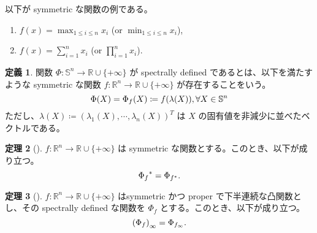\documentclass[a4paper,11pt]{jsarticle}
\theoremstyle{definition}
\newtheorem{thm}{定理}
\newtheorem{dfn}[thm]{定義}
\newcommand{\RealNumberSet}{\mathbb{R}}
\newcommand{\NDemenstionalRealEuclideanSpace}{\mathbb{R}^n}
\newcommand{\NDemenstionalRealSymmetricMatrixSpace}{\mathbb{S}^n}
\newcommand{\ExtendedRealValuedFunction}[2]{{#1}: {#2} \to \RealNumberSet \cup \{+\infty\}}
\begin{document}
以下が symmetric な関数の例である。

\begin{enumerate}
  \item $f(x) = \max_{1 \leq i \leq n} x_i$ (or $\min_{1 \leq i \leq n} x_i$),
  \item $f(x) = \sum_{i = 1}^{n} x_i$ (or $\prod_{i = 1}^{n} x_i$).
\end{enumerate}

\begin{dfn}
  関数 $\ExtendedRealValuedFunction{\Phi}{\NDemenstionalRealSymmetricMatrixSpace}$ が spectrally defined であるとは、以下を満たすような symmetric な関数 $\ExtendedRealValuedFunction{f}{\NDemenstionalRealEuclideanSpace}$ が存在することをいう。
  \begin{equation}
    \Phi (X) = \Phi_{f}(X) \coloneqq f(\lambda (X)), \forall X \in \NDemenstionalRealSymmetricMatrixSpace \notag
  \end{equation}
  ただし、$\lambda (X) \coloneqq (\lambda_1 (X), \dotsb , \lambda_n (X))^T$ は $X$ の固有値を非減少に並べたベクトルである。
\end{dfn}

\begin{thm}[\mbox{\cite[Lewis (1996)]{Lewis96}}]\label{Lewis96}
  $\ExtendedRealValuedFunction{f}{\NDemenstionalRealEuclideanSpace}$ は symmetric な関数とする。このとき、以下が成り立つ。
  \begin{equation}
    {\Phi_{f}}^* = \Phi_{f^*}. \notag
  \end{equation}
\end{thm}

\begin{thm}[\mbox{\cite[Seeger (1997)]{Seeger97}}]\label{Seeger97}
  $\ExtendedRealValuedFunction{f}{\NDemenstionalRealEuclideanSpace}$ はsymmetric かつ proper で下半連続な凸関数とし、その spectrally defined な関数を $\Phi_{f}$ とする。このとき、以下が成り立つ。
  \begin{equation}
    {(\Phi_{f})}_{\infty} = \Phi_{f_{\infty}}. \notag
  \end{equation}
\end{thm}
\end{document}
